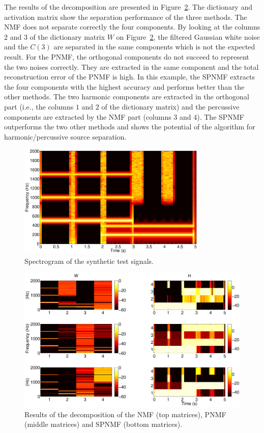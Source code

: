 The results of the decomposition are presented in Figure~\ref{resultONMF2}. The dictionary and activation matrix show the separation performance of the three methods. The NMF does not separate correctly the four components. By looking at the columns $2$ and $3$ of the dictionary matrix $W$ on Figure~\ref{resultONMF2}, the filtered Gaussian white noise and the $C(3)$ are separated in the same components which is not the expected result.
For the PNMF, the orthogonal components do not succeed to represent the two noises correctly. They are extracted in the same component and the total reconstruction error of the PNMF is high.
In this example, the SPNMF extracts the four components with the highest accuracy and performs better than the other methods. The two harmonic components are extracted in the orthogonal part (i.e., the columns $1$ and $2$ of the dictionary matrix) and the percussive components are extracted by the NMF part (columns $3$ and $4$). The SPNMF outperforms the two other methods and shows the potential of the algorithm for harmonic/percussive source separation.
%

\begin{figure}[htb]

  \centering 
  \includegraphics[width=9cm]{fig/synthetictestspectrogram.eps}
  \caption{\label{SpectroSynth} Spectrogram of the synthetic test signals.}
  
\end{figure}

\begin{figure}
   
	\centering    
  \includegraphics[width=15cm]{fig/WHcomp.eps}

\caption{\label{resultONMF2} Results of the decomposition of the NMF (top matrices), PNMF (middle matrices) and SPNMF (bottom matrices).}


\end{figure}


